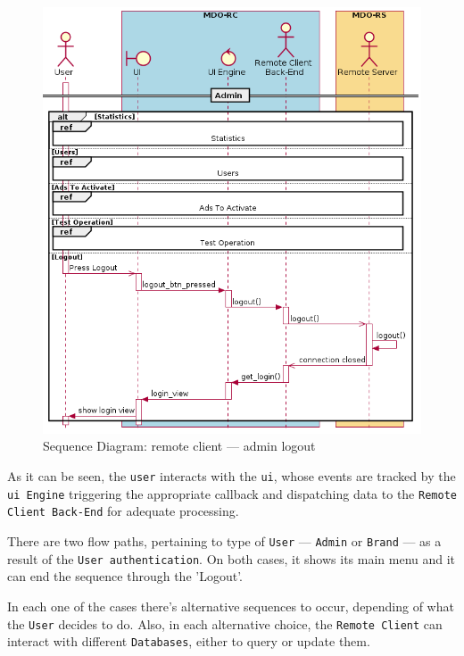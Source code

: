 \begin{figure}[htb!]
\centering
    \includegraphics[width=0.7\columnwidth]{./img/seq-rc-admin-logout.png}
  \caption{Sequence Diagram: remote client --- admin logout}%
\label{fig:seq-rc-admin-logout}
\end{figure}

As it can be seen, the \texttt{user} interacts with the \texttt{\gls{ui}}, whose events
are tracked by the \texttt{\gls{ui} Engine} triggering the appropriate callback
and dispatching data to the \texttt{Remote
  Client Back-End} for adequate processing.

There are two flow paths, pertaining to type of \texttt{User} --- \texttt{Admin}
or \texttt{Brand} --- as a result of the \texttt{User authentication}.
On both cases, it shows its main menu and it can end the sequence through the
'Logout'.

In each one of the cases there's alternative sequences to occur, depending of what the \texttt{User} decides to do.
Also, in each alternative choice, the \texttt{Remote Client} can interact with
different \texttt{Databases}, either to query or update them.
%
